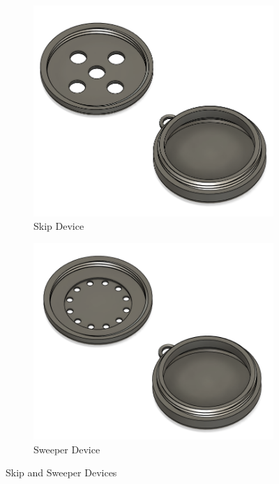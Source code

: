 \documentclass{article}
\begin{document}
\begin{figure}[ht!]
    \centering
    \begin{subfigure}{0.495\textwidth}
        \includegraphics[width=\textwidth]{skip_device.png}
        \caption{Skip Device}
        \label{fig:skip_device}
    \end{subfigure}
    \begin{subfigure}{0.495\textwidth}
        \includegraphics[width=\textwidth]{sweeper_device.png}
        \caption{Sweeper Device}
        \label{fig:sweeper_device}
    \end{subfigure}
    \caption{Skip and Sweeper Devices}
\end{figure}
\end{document}
